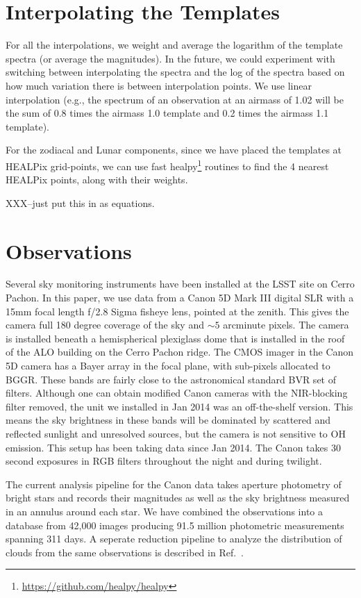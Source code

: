 \documentclass[]{spie}
\begin{document}
\section{Interpolating the Templates}\label{sec:interp}

For all the interpolations, we weight and average the logarithm of the template spectra (or average the magnitudes).  In the future, we could experiment with switching between interpolating the spectra and the log of the spectra based on how much variation there is between interpolation points.  We use linear interpolation (e.g., the spectrum of an observation at an airmass of 1.02 will be the sum of 0.8 times the airmass 1.0 template and 0.2 times the airmass 1.1 template). 

For the zodiacal and Lunar components, since we have placed the templates at HEALPix grid-points, we can use fast healpy\footnote{\url{https://github.com/healpy/healpy}} routines to find the 4 nearest HEALPix points, along with their weights.  

XXX--just put this in as equations.

\section{Observations}\label{sec:obs}

Several sky monitoring instruments have been installed at the LSST site on Cerro Pachon.  In this paper, we use data from a Canon 5D Mark III digital SLR with a 15mm focal length f/2.8 Sigma fisheye lens, pointed at the zenith. This gives the camera full 180 degree coverage of the sky and $\sim5$ arcminute pixels. The camera is installed beneath a hemispherical plexiglass dome that is installed in the roof of the ALO building on the Cerro Pachon ridge.  The CMOS imager in the Canon 5D camera has a Bayer array in the focal plane, with sub-pixels allocated to BGGR.  These bands are fairly close to the astronomical standard BVR set of filters. Although one can obtain modified Canon cameras with the NIR-blocking filter removed, the unit we installed in Jan 2014 was an off-the-shelf version. This means the sky brightness in these bands will be dominated by scattered and reflected sunlight and unresolved sources, but the camera is not sensitive to OH emission.  This setup has been taking data since Jan 2014.  The Canon takes 30 second exposures in RGB filters throughout the night and during twilight. 

The current analysis pipeline for the Canon data takes aperture photometry of bright stars and records their magnitudes as well as the sky brightness measured in an annulus around each star.  We have combined the observations into a database from 42,000 images producing 91.5 million photometric measurements spanning 311 days.  A seperate reduction pipeline to analyze the distribution of clouds from the same observations is described in Ref.~.
\end{document}
